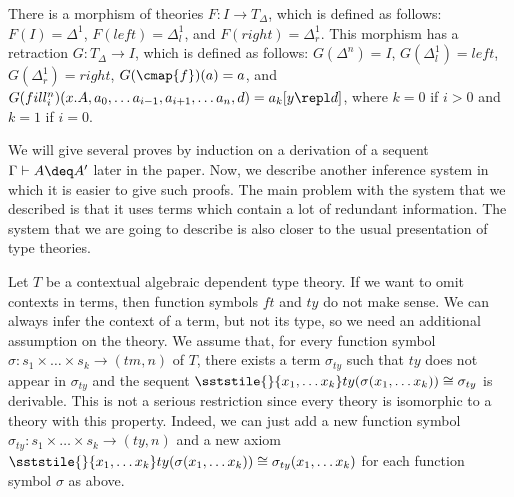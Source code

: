 There is a morphism of theories $F : I \to T_\Delta$, which is defined as follows: $F(I) = \Delta^1$, $F(left) = \Delta^1_l$, and $F(right) = \Delta^1_r$.
This morphism has a retraction $G : T_\Delta \to I$, which is defined as follows: $G(\Delta^n) = I$, $G(\Delta^1_l) = left$, $G(\Delta^1_r) = right$, $G(\cmap{f})(a) = a$,
and $G(fill^n_i)(x.A, a_0, \ldots a_{i-1}, a_{i+1}, \ldots a_n, d) = a_k[y \repl d]$, where $k = 0$ if $i > 0$ and $k = 1$ if $i = 0$.


We will give several proves by induction on a derivation of a sequent $\Gamma \vdash A \deq A'$ later in the paper.
Now, we describe another inference system in which it is easier to give such proofs.
The main problem with the system that we described is that it uses terms which contain a lot of redundant information.
The system that we are going to describe is also closer to the usual presentation of type theories.

Let $T$ be a contextual algebraic dependent type theory.
If we want to omit contexts in terms, then function symbols $ft$ and $ty$ do not make sense.
We can always infer the context of a term, but not its type, so we need an additional assumption on the theory.
We assume that, for every function symbol $\sigma : s_1 \times \ldots \times s_k \to (tm,n)$ of $T$,
there exists a term $\sigma_{ty}$ such that $ty$ does not appear in $\sigma_{ty}$ and the sequent $\sststile{}{x_1, \ldots x_k} ty(\sigma(x_1, \ldots x_k)) \cong \sigma_{ty}$ is derivable.
This is not a serious restriction since every theory is isomorphic to a theory with this property.
Indeed, we can just add a new function symbol $\sigma_{ty} : s_1 \times \ldots \times s_k \to (ty,n)$
and a new axiom $\sststile{}{x_1, \ldots x_k} ty(\sigma(x_1, \ldots x_k)) \cong \sigma_{ty}(x_1, \ldots x_k)$ for each function symbol $\sigma$ as above.

